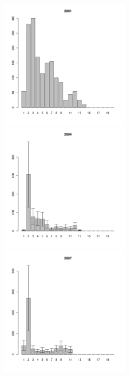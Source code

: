 \documentclass[12pt, a4paper]{article}
\begin{document}
\begin{figure}[h]

\begin{multicols}{3}
\hfill
\includegraphics[width=65mm]{../White_Sea/Luvenga_Goreliy/high_2001_.pdf}
\hfill
\includegraphics[width=65mm]{../White_Sea/Luvenga_Goreliy/high_2004_.pdf}
\hfill
\includegraphics[width=65mm]{../White_Sea/Luvenga_Goreliy/high_2007_.pdf}
\end{multicols}


\end{figure}
\end{document}
